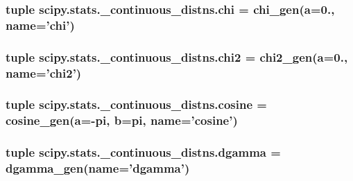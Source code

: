 \subsubsection[{chi}]{\setlength{\rightskip}{0pt plus 5cm}tuple scipy.\+stats.\+\_\+continuous\+\_\+distns.\+chi = {\bf chi\+\_\+gen}({\bf a}=0., name='chi')}\label{namespacescipy_1_1stats_1_1__continuous__distns_ad66cbb89f848c88a19fc3fc9dbfcf831}
\hypertarget{namespacescipy_1_1stats_1_1__continuous__distns_ada5da73bf93d38265ce70b40c7164413}{}
\subsubsection[{chi2}]{\setlength{\rightskip}{0pt plus 5cm}tuple scipy.\+stats.\+\_\+continuous\+\_\+distns.\+chi2 = {\bf chi2\+\_\+gen}({\bf a}=0., name='chi2')}\label{namespacescipy_1_1stats_1_1__continuous__distns_ada5da73bf93d38265ce70b40c7164413}
\hypertarget{namespacescipy_1_1stats_1_1__continuous__distns_ac7776e748e7a4c3a6d6e4e41a4fa6d48}{}
\subsubsection[{cosine}]{\setlength{\rightskip}{0pt plus 5cm}tuple scipy.\+stats.\+\_\+continuous\+\_\+distns.\+cosine = {\bf cosine\+\_\+gen}({\bf a}=-\/pi, {\bf b}=pi, name='cosine')}\label{namespacescipy_1_1stats_1_1__continuous__distns_ac7776e748e7a4c3a6d6e4e41a4fa6d48}
\hypertarget{namespacescipy_1_1stats_1_1__continuous__distns_a22e23f6f57546ebbbd0155628697852b}{}
\subsubsection[{dgamma}]{\setlength{\rightskip}{0pt plus 5cm}tuple scipy.\+stats.\+\_\+continuous\+\_\+distns.\+dgamma = {\bf dgamma\+\_\+gen}(name='dgamma')}\label{namespacescipy_1_1stats_1_1__continuous__distns_a22e23f6f57546ebbbd0155628697852b}
\hypertarget{namespacescipy_1_1stats_1_1__continuous__distns_a72615017f1efee409fa40e16fa054aa9}{}
